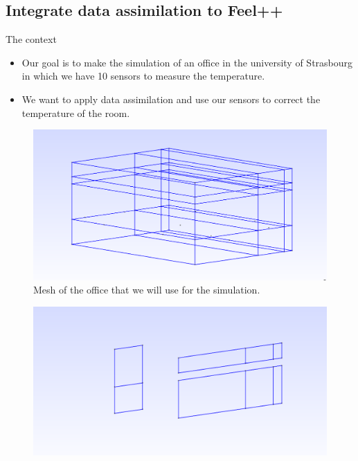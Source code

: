 \subsection{Integrate data assimilation to Feel++}
\begin{frame}[allowframebreaks]{The context}
\begin{itemize}
    \item Our goal is to make the simulation of an office in the university of Strasbourg in which we have 10 sensors to measure the temperature.\\
    \item We want to apply data assimilation and use our sensors to correct the temperature of the room.
\end{itemize}

\begin{minipage}{0.48\linewidth}
    \begin{figure}
        \centering
        \includegraphics[width=\linewidth]{"images/enkf/Maillage_1.jpg"}
        \caption{Mesh of the office that we will use for the simulation.}
    \end{figure}
\end{minipage} \;
\begin{minipage}{0.48\linewidth}
    \begin{figure}
        \centering
        \includegraphics[width=\linewidth]{"images/enkf/Maillage_2.jpg"}

\end{figure}
\end{minipage}
\end{frame}
